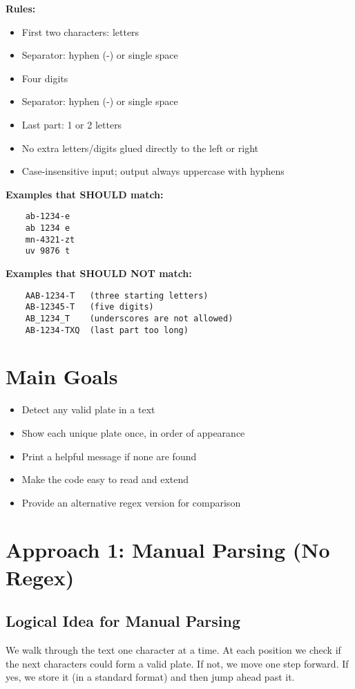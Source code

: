 \documentclass[12pt,a4paper]{article}
\begin{document}
\noindent \textbf{Rules:}
\begin{itemize}
    \item First two characters: letters
    \item Separator: hyphen (-) or single space
    \item Four digits
    \item Separator: hyphen (-) or single space
    \item Last part: 1 or 2 letters
    \item No extra letters/digits glued directly to the left or right
    \item Case-insensitive input; output always uppercase with hyphens
\end{itemize}

\noindent \textbf{Examples that SHOULD match:}
\begin{verbatim}
    ab-1234-e
    ab 1234 e
    mn-4321-zt
    uv 9876 t
\end{verbatim}

\noindent \textbf{Examples that SHOULD NOT match:}
\begin{verbatim}
    AAB-1234-T   (three starting letters)
    AB-12345-T   (five digits)
    AB_1234_T    (underscores are not allowed)
    AB-1234-TXQ  (last part too long)
\end{verbatim}

\section{Main Goals}
\begin{itemize}
    \item Detect any valid plate in a text
    \item Show each unique plate once, in order of appearance
    \item Print a helpful message if none are found
    \item Make the code easy to read and extend
    \item Provide an alternative regex version for comparison
\end{itemize}

\section{Approach 1: Manual Parsing (No Regex)}
\subsection{Logical Idea for Manual Parsing}
We walk through the text one character at a time. At each position we check if the next characters could form a valid plate. If not, we move one step forward. If yes, we store it (in a standard format) and then jump ahead past it.
\end{document}
